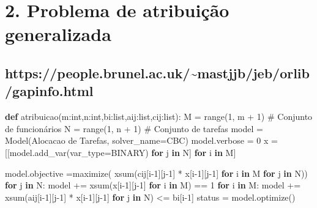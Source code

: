\documentclass[
  letterpaper,
  DIV=11,
  numbers=noendperiod]{scrartcl}
\newenvironment{Shaded}{\begin{snugshade}}{\end{snugshade}}
\newcommand{\BuiltInTok}[1]{\textcolor[rgb]{0.00,0.23,0.31}{#1}}
\newcommand{\CommentTok}[1]{\textcolor[rgb]{0.37,0.37,0.37}{#1}}
\newcommand{\ControlFlowTok}[1]{\textcolor[rgb]{0.00,0.23,0.31}{\textbf{#1}}}
\newcommand{\DecValTok}[1]{\textcolor[rgb]{0.68,0.00,0.00}{#1}}
\newcommand{\KeywordTok}[1]{\textcolor[rgb]{0.00,0.23,0.31}{\textbf{#1}}}
\newcommand{\NormalTok}[1]{\textcolor[rgb]{0.00,0.23,0.31}{#1}}
\newcommand{\OperatorTok}[1]{\textcolor[rgb]{0.37,0.37,0.37}{#1}}
\newcommand{\StringTok}[1]{\textcolor[rgb]{0.13,0.47,0.30}{#1}}
\begin{document}
\section{2. Problema de atribuição
generalizada}\label{problema-de-atribuiuxe7uxe3o-generalizada}

\subsection{https://people.brunel.ac.uk/\textasciitilde mastjjb/jeb/orlib/gapinfo.html}\label{httpspeople.brunel.ac.ukmastjjbjeborlibgapinfo.html}

\begin{Shaded}
\begin{Highlighting}[]
\KeywordTok{def}\NormalTok{ atribuicao(m:}\BuiltInTok{int}\NormalTok{,n:}\BuiltInTok{int}\NormalTok{,bi:}\BuiltInTok{list}\NormalTok{,aij:}\BuiltInTok{list}\NormalTok{,cij:}\BuiltInTok{list}\NormalTok{):}
\NormalTok{    M }\OperatorTok{=} \BuiltInTok{range}\NormalTok{(}\DecValTok{1}\NormalTok{, m }\OperatorTok{+} \DecValTok{1}\NormalTok{)  }\CommentTok{\# Conjunto de funcionários}
\NormalTok{    N }\OperatorTok{=} \BuiltInTok{range}\NormalTok{(}\DecValTok{1}\NormalTok{, n }\OperatorTok{+} \DecValTok{1}\NormalTok{)  }\CommentTok{\# Conjunto de tarefas}
\NormalTok{    model }\OperatorTok{=}\NormalTok{ Model(}\StringTok{\textquotesingle{}Alocacao de Tarefas\textquotesingle{}}\NormalTok{, solver\_name}\OperatorTok{=}\NormalTok{CBC)}
\NormalTok{    model.verbose }\OperatorTok{=} \DecValTok{0}
\NormalTok{    x }\OperatorTok{=}\NormalTok{ [[model.add\_var(var\_type}\OperatorTok{=}\NormalTok{BINARY) }\ControlFlowTok{for}\NormalTok{ j }\KeywordTok{in}\NormalTok{ N] }\ControlFlowTok{for}\NormalTok{ i }\KeywordTok{in}\NormalTok{ M]}

\NormalTok{    model.objective }\OperatorTok{=}\NormalTok{maximize( xsum(cij[i}\OperatorTok{{-}}\DecValTok{1}\NormalTok{][j}\OperatorTok{{-}}\DecValTok{1}\NormalTok{] }\OperatorTok{*}\NormalTok{ x[i}\OperatorTok{{-}}\DecValTok{1}\NormalTok{][j}\OperatorTok{{-}}\DecValTok{1}\NormalTok{] }\ControlFlowTok{for}\NormalTok{ i }\KeywordTok{in}\NormalTok{ M }\ControlFlowTok{for}\NormalTok{ j }\KeywordTok{in}\NormalTok{ N))}
    \ControlFlowTok{for}\NormalTok{ j }\KeywordTok{in}\NormalTok{ N:}
\NormalTok{        model }\OperatorTok{+=}\NormalTok{ xsum(x[i}\OperatorTok{{-}}\DecValTok{1}\NormalTok{][j}\OperatorTok{{-}}\DecValTok{1}\NormalTok{] }\ControlFlowTok{for}\NormalTok{ i }\KeywordTok{in}\NormalTok{ M) }\OperatorTok{==} \DecValTok{1}
    \ControlFlowTok{for}\NormalTok{ i }\KeywordTok{in}\NormalTok{ M:}
\NormalTok{        model }\OperatorTok{+=}\NormalTok{ xsum(aij[i}\OperatorTok{{-}}\DecValTok{1}\NormalTok{][j}\OperatorTok{{-}}\DecValTok{1}\NormalTok{] }\OperatorTok{*}\NormalTok{ x[i}\OperatorTok{{-}}\DecValTok{1}\NormalTok{][j}\OperatorTok{{-}}\DecValTok{1}\NormalTok{] }\ControlFlowTok{for}\NormalTok{ j }\KeywordTok{in}\NormalTok{ N) }\OperatorTok{\textless{}=}\NormalTok{ bi[i}\OperatorTok{{-}}\DecValTok{1}\NormalTok{]}
\NormalTok{    status }\OperatorTok{=}\NormalTok{ model.optimize()}


\end{Highlighting}
\end{Shaded}
\end{document}
